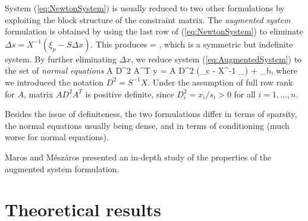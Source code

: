 System (\ref{eq:NewtonSystem}) is usually reduced to two other
formulations by exploiting the block structure of the constraint
matrix.
%
The {\em augmented system} formulation is obtained by using 
the last row of (\ref{eq:NewtonSystem}) to eliminate
$\Delta s = X^{-1} (\xi_\mu - S\Delta x)$.
This produces
%
\be \label{eq:AugmentedSystem}
\left[ \begin{array}{cc}
    -X^{-1}S & A^T \\ A & 0
  \end{array} \right]
 =
\left[ \begin{array}{c}
    \xi_c - X^{-1}\xi_\mu \\ \xi_b
   \end{array} \right],
\ee
which is a symmetric but indefinite system.
%
By further eliminating $\Delta x$, we reduce system 
(\ref{eq:AugmentedSystem}) to the set of {\em normal equations}
%
\be \label{eq:NormalEquations}
  A D^2 A^T \Delta y = A D^2 (\xi_c - X^{-1} \xi_\mu) + \xi_b,
\ee
%
where we introduced the notation $D^2 = S^{-1} X$.
Under the assumption of full row rank for $A$, matrix 
$A D^2 A^T$ is positive definite, since $D^2_i = x_i/s_i > 0$ for
all $i = 1, \ldots, n$.

Besides the issue of definiteness, the two formulations differ in
terms of sparsity, the normal equations usually being dense, and
in terms of conditioning (much worse for normal equations).


Maros and M\'esz\'aros \cite{MarosMeszaros} presented an in-depth 
study of the properties of the augmented system formulation.

%
%
\section{Theoretical results}
\label{sec:TheoreticalResults}

